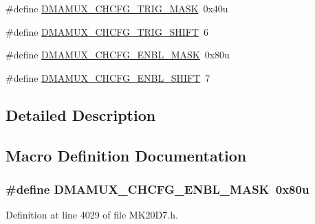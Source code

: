 \begin{DoxyCompactItemize}
$$\item 
\#define \hyperlink{group___d_m_a_m_u_x___register___masks_gafd2b6158f86bedffb640e73c40cdd0f5}{D\+M\+A\+M\+U\+X\+\_\+\+C\+H\+C\+F\+G\+\_\+\+T\+R\+I\+G\+\_\+\+M\+A\+SK}~0x40u
\item 
\#define \hyperlink{group___d_m_a_m_u_x___register___masks_ga714a6b142fde49d701e3f624bb2417e1}{D\+M\+A\+M\+U\+X\+\_\+\+C\+H\+C\+F\+G\+\_\+\+T\+R\+I\+G\+\_\+\+S\+H\+I\+FT}~6
\item 
\#define \hyperlink{group___d_m_a_m_u_x___register___masks_ga311ccb0a9a00f29da44f8c41b33ba79f}{D\+M\+A\+M\+U\+X\+\_\+\+C\+H\+C\+F\+G\+\_\+\+E\+N\+B\+L\+\_\+\+M\+A\+SK}~0x80u
\item 
\#define \hyperlink{group___d_m_a_m_u_x___register___masks_ga23d6f41370761b5c68e4d49f419aaee9}{D\+M\+A\+M\+U\+X\+\_\+\+C\+H\+C\+F\+G\+\_\+\+E\+N\+B\+L\+\_\+\+S\+H\+I\+FT}~7
\end{DoxyCompactItemize}


\subsection{Detailed Description}


\subsection{Macro Definition Documentation}
\subsubsection[{\texorpdfstring{D\+M\+A\+M\+U\+X\+\_\+\+C\+H\+C\+F\+G\+\_\+\+E\+N\+B\+L\+\_\+\+M\+A\+SK}{DMAMUX_CHCFG_ENBL_MASK}}]{\setlength{\rightskip}{0pt plus 5cm}\#define D\+M\+A\+M\+U\+X\+\_\+\+C\+H\+C\+F\+G\+\_\+\+E\+N\+B\+L\+\_\+\+M\+A\+SK~0x80u}\hypertarget{group___d_m_a_m_u_x___register___masks_ga311ccb0a9a00f29da44f8c41b33ba79f}{}\label{group___d_m_a_m_u_x___register___masks_ga311ccb0a9a00f29da44f8c41b33ba79f}


Definition at line 4029 of file M\+K20\+D7.\+h.

